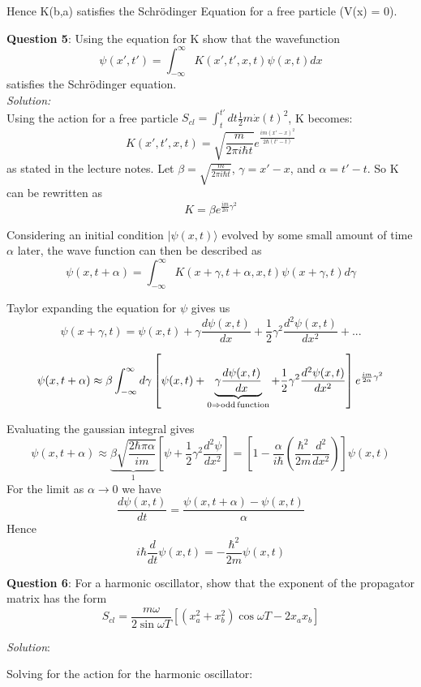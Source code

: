 \documentclass{article}
\begin{document}
Hence K(b,a) satisfies the Schr\"odinger Equation for a free particle (V(x) = 0).


\bigskip
\textbf{Question 5}: Using the equation for K show that the wavefunction 
	\[\psi(x', t') = \int^{\infty}_{-\infty} K(x', t', x, t) \psi(x,t) dx \]
satisfies the Schr\"odinger equation. \\

\textit{Solution:} \\
Using the action for a free particle $S_{cl} = \int^{t'}_{t} dt \frac{1}{2} m \dot{x}(t)^2 $, K becomes:
	\[K(x', t', x, t) = \sqrt{\frac{m}{2\pi i\hbar t}} e^{\frac{im(x' - x)^2}{2\hbar (t' - t)}} \]
as stated in the lecture notes. Let $\beta = \sqrt{\frac{m}{2\pi i\hbar t}}$, $\gamma = x' - x$, and $\alpha = t' - t$. So K can be rewritten as
	\[K = \beta e^{\frac{im}{2\alpha} \gamma^2} \]

Considering an initial condition $|\psi(x,t) \rangle$ evolved by some small amount of time $\alpha$ later, the wave function can then be described as 
	\[\psi(x, t+\alpha) = \int^{\infty}_{-\infty} K(x+\gamma, t+\alpha, x, t) \psi(x+\gamma,t) d\gamma \]

Taylor expanding the equation for $\psi$ gives us
	\[\psi(x+\gamma, t) = \psi(x,t) + \gamma \frac{d\psi(x,t)}{dx} + \frac{1}{2} \gamma^2 \frac{d^2\psi(x,t)}{dx^2} + ... \]

	\[\psi(x, t+\alpha) \approx \beta \int^{\infty}_{-\infty} d\gamma \left[\psi(x,t) +  \underbrace{\gamma \frac{d\psi(x,t)}{dx}}_{0 \Rightarrow \rm{odd \, function}} + \frac{1}{2} \gamma^2 \frac{d^2\psi(x,t)}{dx^2} \right] e^{\frac{im}{2\alpha} \gamma^2} \]

Evaluating the gaussian integral gives 
	\[\psi(x, t+\alpha) \approx \underbrace{\beta \sqrt{\frac{2\hbar \pi \alpha}{i m}}}_{1} \left[\psi + \frac{1}{2}\gamma^2 \frac{d^2\psi}{dx^2} \right]  = \left[1 - \frac{\alpha}{i\hbar} \left(\frac{\hbar^2}{2m} \frac{d^2}{dx^2} \right)\right] \psi(x,t) \]
For the limit as $\alpha \rightarrow 0$ we have
	\[\frac{d\psi(x,t)}{dt} = \frac{\psi(x,t+\alpha) - \psi(x, t)}{\alpha} \]
Hence 
	\[i\hbar \frac{d}{dt}\psi(x,t) = -\frac{\hbar^2}{2m} \psi(x,t) \]


\bigskip
\textbf{Question 6}: For a harmonic oscillator, show that the exponent of the propagator matrix has the form 
\[S_{cl} = \frac{m\omega}{2 \sin\omega T} \left[(x_a^2 + x_b^2) \cos \omega T - 2x_a x_b \right] \]

\textit{Solution}:

Solving for the action for the harmonic oscillator:
\end{document}
